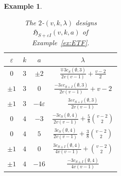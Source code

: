 \documentclass[11pt]{article}
\newtheorem{example}[theorem]{Example}
\begin{document}
\begin{example}
\begin{table}[h!]
    \centering
    \begin{tabular}{c|c|c|c}
          $\varepsilon$ & $k$ & $a$ & $\lambda$ \\
        \hline
         $0$ & $3$ & $\pm 2$ & $\frac{\mp 3c_S(\emptyset,3)}{2v(v-1)}+\frac{v-2}{2}$ \\
         $\pm 1$ & $3$ & $0$ & $\frac{-3\varepsilon c_{S+I}(\emptyset,3)}{2v(v-1)}+v-2$ \\
         $\pm 1$ & $3$ & $-4\varepsilon$ & $\frac{3\varepsilon c_{S+I}(\emptyset,3)}{2v(v-1)}$ \\
        $0$ & $4$ & $-3$ & $\frac{-3c_S(\emptyset,4)}{2v(v-1)}+\frac{5}{8}\binom{v-2}{2}$ \\
        $0$ & $4$ & $5$ & $\frac{3c_S(\emptyset,4)}{2v(v-1)}+\frac{3}{8}\binom{v-2}{2}$ \\
        $\pm 1$ & $4$ & $0$ & $\frac{3c_{S\pm I}(\emptyset,4)}{4v(v-1)}+\binom{v-2}{2}$ \\
        $\pm 1$ & $4$ & $-16$ & $\frac{-3c_{S\pm I}(\emptyset,4)}{4v(v-1)}$ \\
    \end{tabular}
    \caption{The $2$-$(v,k,\lambda)$ designs $\mathfrak H_{S+\varepsilon I}(v,k,a)$ of Example~\ref{ex:ETF}.}
    \label{tab:ETF}
\end{table}



\end{example}
\end{document}
